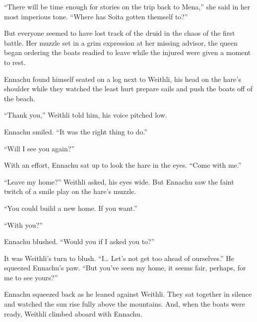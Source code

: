 ``There will be time enough for stories on the trip back to Mena,'' she said in her most imperious tone. ``Where has Soita gotten themself to?''

But everyone seemed to have lost track of the druid in the chaos of the first battle. Her muzzle set in a grim expression at her missing advisor, the queen began ordering the boats readied to leave while the injured were given a moment to rest.

Ennachu found himself seated on a log next to Weithli, his head on the hare's shoulder while they watched the least hurt prepare sails and push the boats off of the beach.

``Thank you,'' Weithli told him, his voice pitched low.

Ennachu smiled. ``It was the right thing to do.''

``Will I see you again?''

With an effort, Ennachu sat up to look the hare in the eyes. ``Come with me.''

``Leave my home?'' Weithli asked, his eyes wide. But Ennachu saw the faint twitch of a smile play on the hare's muzzle.

``You could build a new home. If you want.''

``With you?''

Ennachu blushed. ``Would you if I asked you to?''

It was Weithli's turn to blush. ``I\ldots{} Let's not get too ahead of ourselves.'' He squeezed Ennachu's paw. ``But you've seen my home, it seems fair, perhaps, for me to see yours?''

Ennachu squeezed back as he leaned against Weithli. They sat together in silence and watched the sun rise fully above the mountains. And, when the boats were ready, Weithli climbed aboard with Ennachu.

